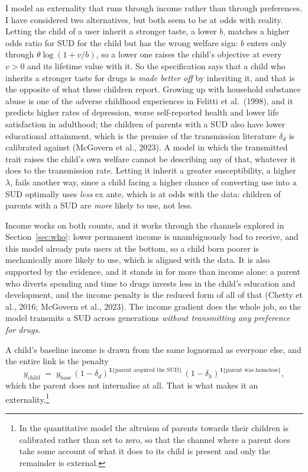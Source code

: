 \documentclass[10pt]{article}
\begin{document}
I model an externality that runs through income rather than through
preferences. I have considered two alternatives, but both seem to be at odds
with reality. Letting the child of a user inherit a stronger taste, a lower $b$,
matches a higher odds ratio for SUD for the child but has the wrong welfare sign: $b$ enters only
through $\theta\log(1+v/b)$, so a lower one raises the child's objective at every
$v>0$ and its lifetime value with it. So the specification says that a child
who inherits a stronger taste for drugs is \emph{made better off} by inheriting
it, and that is the opposite of what these children report. Growing up with
household substance abuse is one of the adverse childhood experiences in Felitti
et al.\ (1998), and it predicts higher rates of depression, worse self-reported
health and lower life satisfaction in adulthood; the children of parents with a
SUD also have lower educational attainment, which is the premise of the
transmission literature $\delta_d$ is calibrated against (McGovern et al., 2023).
A model in which the transmitted trait raises the child's own welfare cannot be
describing any of that, whatever it does to the transmission rate. Letting it inherit a greater
susceptibility, a higher $\lambda$, fails another way, since a child facing a
higher chance of converting use into a SUD optimally uses \emph{less} ex ante, which is at odds with the
data: children of parents with a SUD are \emph{more} likely to use, not less.

Income works on both counts, and it works through the channels explored in
Section~\ref{sec:who}: lower permanent income is unambiguously bad to receive,
and this model already puts users at the bottom, so a child born poorer is
mechanically more likely to use, which is aligned with the data. It is also
supported by the evidence, and it stands in for more than income alone: a parent
who diverts spending and time to drugs invests less in the child's education and
development, and the income penalty is the reduced form of all of that (Chetty et al., 2016; McGovern et al., 2023). The income
gradient does the whole job, so the model transmits a SUD across generations
\emph{without transmitting any preference for drugs}.

A child's baseline income is drawn from the same lognormal as everyone else, and
the entire link is the penalty
\begin{equation}\label{eq:kids}
y_{\text{child}} \;=\; y_{\text{base}}\,
(1-\delta_d)^{\mathbf{1}\{\text{parent acquired the SUD}\}}\,
(1-\delta_h)^{\mathbf{1}\{\text{parent was homeless}\}} ,
\end{equation}
which the parent does not internalise at all. That is what makes it an externality.\footnote{In the quantitative
model the altruism of parents towards their children is calibrated rather than
set to zero, so that the channel where a parent does take some account of what it
does to its child is present and only the remainder is external.}
\end{document}

